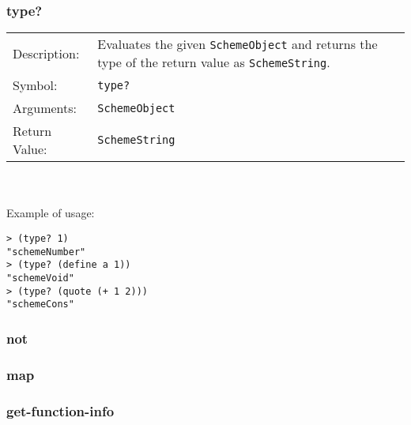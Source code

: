 \documentclass[12pt,a4paper]{scrartcl}
\begin{document}
\subsubsection*{type?}
\begin{tabular}{l  p{13cm}}
Description: & Evaluates the given \lstinline{SchemeObject} and returns the type of the return value as \lstinline{SchemeString}.\\
Symbol: & \lstinline{type?}\\
Arguments: & \lstinline{SchemeObject}\\
Return Value: & \lstinline{SchemeString}
\end{tabular}
\\
\\
Example of usage:
\begin{lstlisting}
> (type? 1)
"schemeNumber"
> (type? (define a 1))
"schemeVoid"
> (type? (quote (+ 1 2)))
"schemeCons"
\end{lstlisting}

\subsubsection*{not}
\subsubsection*{map}
\subsubsection*{get-function-info}
\end{document}
